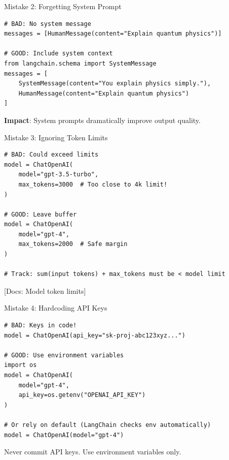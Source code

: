 \documentclass[aspectratio=169,11pt]{beamer}
\newcommand{\docref}[1]{{\scriptsize\color{docgray}[Docs: #1]}}
\begin{document}
\begin{frame}[fragile]{Mistake 2: Forgetting System Prompt}
  \begin{warningbox}
    \begin{lstlisting}
# BAD: No system message
messages = [HumanMessage(content="Explain quantum physics")]

# GOOD: Include system context
from langchain.schema import SystemMessage
messages = [
    SystemMessage(content="You explain physics simply."),
    HumanMessage(content="Explain quantum physics")
]
    \end{lstlisting}
  \end{warningbox}

  \vspace{0.08cm}
  \textbf{Impact}: System prompts dramatically improve output quality.
\end{frame}

\begin{frame}[fragile]{Mistake 3: Ignoring Token Limits}
  \begin{warningbox}
    \begin{lstlisting}
# BAD: Could exceed limits
model = ChatOpenAI(
    model="gpt-3.5-turbo",
    max_tokens=3000  # Too close to 4k limit!
)

# GOOD: Leave buffer
model = ChatOpenAI(
    model="gpt-4",
    max_tokens=2000  # Safe margin
)

# Track: sum(input tokens) + max_tokens must be < model limit
    \end{lstlisting}
  \end{warningbox}

  \docref{Model token limits}
\end{frame}

\begin{frame}[fragile]{Mistake 4: Hardcoding API Keys}
  \begin{warningbox}
    \begin{lstlisting}
# BAD: Keys in code!
model = ChatOpenAI(api_key="sk-proj-abc123xyz...")

# GOOD: Use environment variables
import os
model = ChatOpenAI(
    model="gpt-4",
    api_key=os.getenv("OPENAI_API_KEY")
)

# Or rely on default (LangChain checks env automatically)
model = ChatOpenAI(model="gpt-4")
    \end{lstlisting}
  \end{warningbox}

  \vspace{0.08cm}
  \begin{warningbox}[Rule]
    Never commit API keys. Use environment variables only.
  \end{warningbox}
\end{frame}
\end{document}
